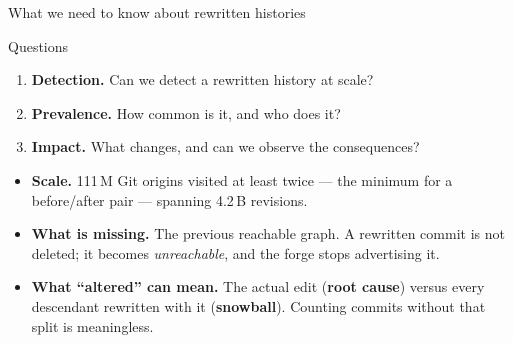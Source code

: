 \documentclass[aspectratio=169]{beamer}
\newcommand{\SWHRevisionsShort}{\num{4.2}\,B\xspace}
\newcommand{\OriginsTwoVisitsOrMoreShort}{\num{111}\,M\xspace}
\begin{document}
\begin{frame}{What we need to know about rewritten histories}
    \begin{block}{Questions}
        \begin{enumerate}\setlength{\itemsep}{0.1em}
            \item \textbf{Detection.} Can we detect a rewritten history at scale?
            \item \textbf{Prevalence.} How common is it, and who does it?
            \item \textbf{Impact.} What changes, and can we observe the consequences?
        \end{enumerate}
    \end{block}
    \begingroup\small
    \begin{itemize}\setlength{\itemsep}{0.55em}
        \item \textbf{Scale.} \OriginsTwoVisitsOrMoreShort{} Git origins visited at
              least twice --- the minimum for a before/after pair --- spanning
              \SWHRevisionsShort{} revisions.
        \item \textbf{What is missing.} The previous reachable graph. A rewritten
              commit is not deleted; it becomes \emph{unreachable}, and the forge
              stops advertising it.
        \item \textbf{What ``altered'' can mean.} The actual edit (\textbf{root cause})
              versus every descendant rewritten with it (\textbf{snowball}). Counting
              commits without that\\split is meaningless.
    \end{itemize}
    \endgroup
\end{frame}
\end{document}
